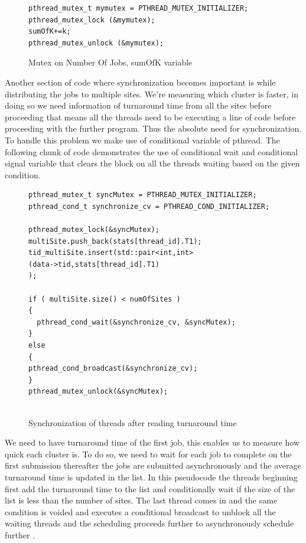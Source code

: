\documentclass[ms,electronic,double]{nuthesis}
\begin{document}
\begin{figure}[htbp!]

\begin{lstlisting}
pthread_mutex_t mymutex = PTHREAD_MUTEX_INITIALIZER;
pthread_mutex_lock (&mymutex);
sumOfK+=k;
pthread_mutex_unlock (&mymutex);
\end{lstlisting}

\caption{Mutex on Number Of Jobs, sumOfK variable}
\label{fig:mutex}

\end{figure}


Another section of code where synchronization becomes important is while 
distributing the jobs to multiple sites. We're measuring which cluster is 
faster, in doing so we need information of turnaround time from all the sites 
before proceeding that means all the threads need to be executing a line of code 
before proceeding with the further program. Thus the absolute need for 
synchronization. To handle this problem we make use of conditional variable of 
pthread. The following chunk of code demonstrates the use of conditional wait 
and conditional signal variable that clears the block on all the threads waiting 
based on the given condition.


\begin{figure}[htbp!]

\begin{lstlisting}
pthread_mutex_t syncMutex = PTHREAD_MUTEX_INITIALIZER;
pthread_cond_t synchronize_cv = PTHREAD_COND_INITIALIZER;

pthread_mutex_lock(&syncMutex);    
multiSite.push_back(stats[thread_id].T1);	
tid_multiSite.insert(std::pair<int,int>
(data->tid,stats[thread_id].T1)
);
	   
if ( multiSite.size() < numOfSites )
{
  pthread_cond_wait(&synchronize_cv, &syncMutex);
}
else
{		
pthread_cond_broadcast(&synchronize_cv);
}
pthread_mutex_unlock(&syncMutex);
    
\end{lstlisting}
\caption{Synchronization of threads after reading turnaround time}
\label{fig:synchronization}
\end{figure}
\FloatBarrier

We need to have turnaround time of the first job,  this enables us to measure 
how quick each cluster is. To do so, we need to wait for each job to complete on 
the first submission thereafter the jobs are submitted asynchronously and the 
average turnaround time is updated in the list. In this pseudocode the threads 
beginning first add the turnaround time to the list and conditionally wait if 
the size of the list is less than the number of sites. The last thread comes in 
and the same condition is voided and executes a conditional broadcast to unblock 
all the waiting threads and the scheduling proceeds further to asynchronously schedule further 
.
\end{document}
